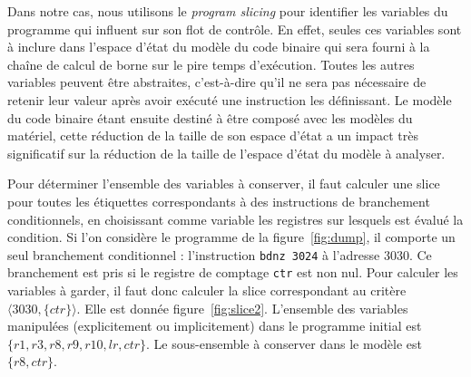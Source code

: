    Dans notre cas, nous utilisons le \emph{program slicing} pour identifier
    les variables du programme qui influent sur son flot de contrôle. En effet,
    seules ces variables sont à inclure dans l'espace d'état du modèle du code
    binaire qui sera fourni à la chaîne de calcul de borne sur le pire temps
    d'exécution. Toutes les autres variables peuvent être abstraites,
    c'est-à-dire qu'il ne sera pas nécessaire de retenir leur valeur après
    avoir \og exécuté \fg une instruction les définissant. Le modèle du code
    binaire étant ensuite destiné à être composé avec les modèles du matériel,
    cette réduction de la taille de son espace d'état a un impact très
    significatif sur la réduction de la taille de l'espace d'état du modèle à
    analyser.

    Pour déterminer l'ensemble des variables à conserver, il faut calculer une
    slice pour toutes les étiquettes correspondants à des instructions de
    branchement conditionnels, en choisissant comme variable les registres sur
    lesquels est évalué la condition. Si l'on considère le programme de la
    figure~\ref{fig:dump}, il comporte un seul branchement conditionnel :
    l'instruction \verb|bdnz 3024| à l'adresse $3030$. Ce branchement est pris
    si le registre de comptage \verb|ctr| est non nul. Pour calculer les
    variables à garder, il faut donc calculer la slice correspondant au critère
    $\langle 3030, \{ctr\} \rangle$. Elle est donnée figure~\ref{fig:slice2}.
    L'ensemble des variables manipulées (explicitement ou implicitement) dans
    le programme initial est $\{r1, r3, r8, r9, r10, lr, ctr\}$. Le
    sous-ensemble à conserver dans le modèle est $\{r8, ctr \}$.


     
